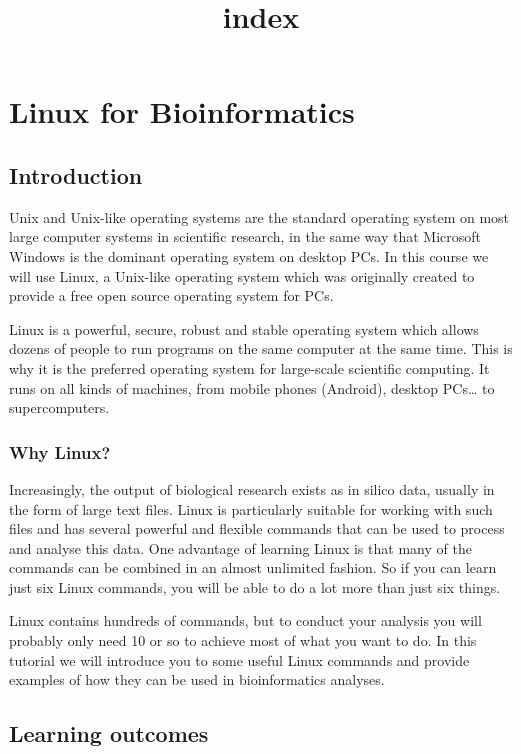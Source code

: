 \documentclass[11pt]{article}
\title{index}
\begin{document}
    \hypertarget{linux-for-bioinformatics}{%
\section{Linux for Bioinformatics}\label{linux-for-bioinformatics}}

\hypertarget{introduction}{%
\subsection{Introduction}\label{introduction}}

Unix and Unix-like operating systems are the standard operating system
on most large computer systems in scientific research, in the same way
that Microsoft Windows is the dominant operating system on desktop PCs.
In this course we will use Linux, a Unix-like operating system which was
originally created to provide a free open source operating system for
PCs.

Linux is a powerful, secure, robust and stable operating system which
allows dozens of people to run programs on the same computer at the same
time. This is why it is the preferred operating system for large-scale
scientific computing. It runs on all kinds of machines, from mobile
phones (Android), desktop PCs\ldots{} to supercomputers.

\hypertarget{why-linux}{%
\subsubsection{Why Linux?}\label{why-linux}}

Increasingly, the output of biological research exists as in silico
data, usually in the form of large text files. Linux is particularly
suitable for working with such files and has several powerful and
flexible commands that can be used to process and analyse this data. One
advantage of learning Linux is that many of the commands can be combined
in an almost unlimited fashion. So if you can learn just six Linux
commands, you will be able to do a lot more than just six things.

Linux contains hundreds of commands, but to conduct your analysis you
will probably only need 10 or so to achieve most of what you want to do.
In this tutorial we will introduce you to some useful Linux commands and
provide examples of how they can be used in bioinformatics analyses.

\hypertarget{learning-outcomes}{%
\subsection{Learning outcomes}\label{learning-outcomes}}
\end{document}
